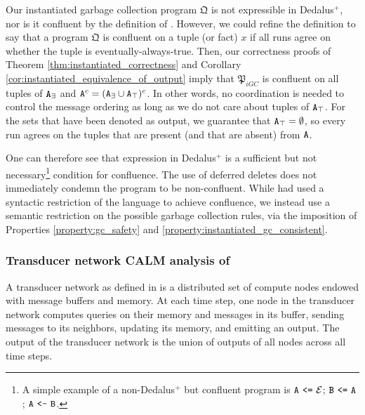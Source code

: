 Our instantiated garbage collection program $\mathfrak{Q}$ is not expressible in Dedalus$^+$, nor is it confluent by the definition of \cite{marczak2012confluence}.
However, we could refine the definition to say that a program $\mathfrak{Q}$ is confluent on a tuple (or fact) $x$ if all runs agree on whether the tuple is eventually-always-true.
Then, our correctness proofs of Theorem \ref{thm:instantiated_correctness} and Corollary \ref{cor:instantiated_equivalence_of_output} imply that $\mathfrak{P}_{iGC}$ is confluent on all tuples of $\tt{A}_\exists$ and $\tt{A}^c = (\tt{A}_\exists \cup \tt{A}_\top)^c$.
In other words, no coordination is needed to control the message ordering as long as we do not care about tuples of $\tt{A}_\top$.
For the sets that have been denoted as output, we guarantee that $\tt{A}_\top = \emptyset$, so every run agrees on the tuples that are present (and that are absent) from $\tt{A}$.

One can therefore see that expression in Dedalus$^+$ is a sufficient but not necessary\footnote{
	A simple example of a non-Dedalus$^+$ but confluent program is $\tt{A} ~\tt{<=}~ \mathcal{E}$; $\tt{B} ~\tt{<=}~ \tt{A}$; $\tt{A} ~\tt{<-}~ \tt{B}$.
} condition for confluence.
The use of deferred deletes does not immediately condemn the program to be non-confluent.
While \cite{marczak2012confluence} had used a syntactic restriction of the language to achieve confluence, we instead use a semantic restriction on the possible garbage collection rules, via the imposition of Properties \ref{property:gc_safety} and \ref{property:instantiated_gc_consistent}.




\subsubsection{Transducer network CALM analysis of \cite{ameloot2013relational}}
A transducer network as defined in \cite{ameloot2013relational} is a distributed set of compute nodes endowed with message buffers and memory.
At each time step, one node in the transducer network computes queries on their memory and messages in its buffer, sending messages to its neighbors, updating its memory, and emitting an output.
The output of the transducer network is the union of outputs of all nodes across all time steps.

